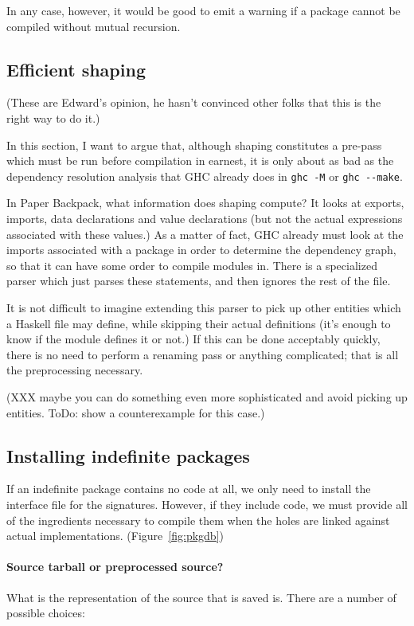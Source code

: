 \documentclass{article}
\begin{document}
In any case, however, it would be good to emit a warning if a package
cannot be compiled without mutual recursion.

\subsection{Efficient shaping}

(These are Edward's opinion, he hasn't convinced other folks that this is
the right way to do it.)

In this section, I want to argue that, although shaping constitutes
a pre-pass which must be run before compilation in earnest, it is only
about as bad as the dependency resolution analysis that GHC already does
in \verb|ghc -M| or \verb|ghc --make|.

In Paper Backpack, what information does shaping compute? It looks at
exports, imports, data declarations and value declarations (but not the
actual expressions associated with these values.)  As a matter of fact,
GHC already must look at the imports associated with a package in order
to determine the dependency graph, so that it can have some order to compile
modules in.  There is a specialized parser which just parses these statements,
and then ignores the rest of the file.

It is not difficult to imagine extending this parser to pick up other entities
which a Haskell file may define, while skipping their actual definitions
(it's enough to know if the module defines it or not.)  If this can be
done acceptably quickly, there is no need to perform a renaming pass or
anything complicated; that is all the preprocessing necessary.

(XXX maybe you can do something even more sophisticated and avoid picking
up entities. ToDo: show a counterexample for this case.)

\subsection{Installing indefinite packages}\label{sec:installing-indefinite}

If an indefinite package contains no code at all, we only need
to install the interface file for the signatures.  However, if
they include code, we must provide all of the
ingredients necessary to compile them when the holes are linked against
actual implementations.  (Figure~\ref{fig:pkgdb})

\paragraph{Source tarball or preprocessed source?}  What is the representation of the source that is saved is.  There
are a number of possible choices:
\end{document}
